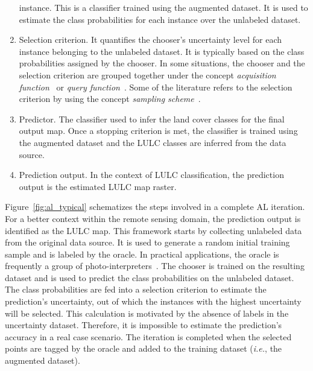 \documentclass[preprint,12pt]{elsarticle}
\begin{document}
\begin{enumerate}
        instance. This is a classifier trained using the augmented dataset.
        It is used to estimate the class probabilities for each instance over
        the unlabeled dataset.
    \item Selection criterion. It quantifies the chooser's uncertainty level
        for each instance belonging to the unlabeled dataset. It is typically
        based on the class probabilities assigned by the chooser. In some
        situations, the chooser and the selection criterion are grouped
        together under the concept \textit{acquisition
        function}~\cite{Ruzicka2020} or \textit{query function}~\cite{Su2020}.
        Some of the literature refers to the selection criterion by using the
        concept \textit{sampling scheme}~\cite{Liu2020}.
    \item Predictor. The classifier used to infer the land cover classes for
        the final output map. Once a stopping criterion is met, the classifier
        is trained using the augmented dataset and the LULC classes are
        inferred from the data source.
    \item Prediction output. In the context of LULC classification, the
        prediction output is the estimated LULC map raster.
\end{enumerate}

Figure~\ref{fig:al_typical} schematizes the steps involved in a complete AL
iteration. For a better context within the remote sensing domain, the
prediction output is identified as the LULC map. This framework starts by
collecting unlabeled data from the original data source. It is used to generate
a random initial training sample and is labeled by the oracle. In practical
applications, the oracle is frequently a group of
photo-interpreters~\cite{Kottke2017}. The chooser is trained on the resulting
dataset and is used to predict the class probabilities on the unlabeled
dataset. The class probabilities are fed into a selection criterion to estimate
the prediction's uncertainty, out of which the instances with the highest
uncertainty will be selected. This calculation is motivated by the absence of
labels in the uncertainty dataset. Therefore, it is impossible to estimate the
prediction's accuracy in a real case scenario. The iteration is completed when
the selected points are tagged by the oracle and added to the training dataset
(\textit{i.e.}, the augmented dataset). 
\end{document}
